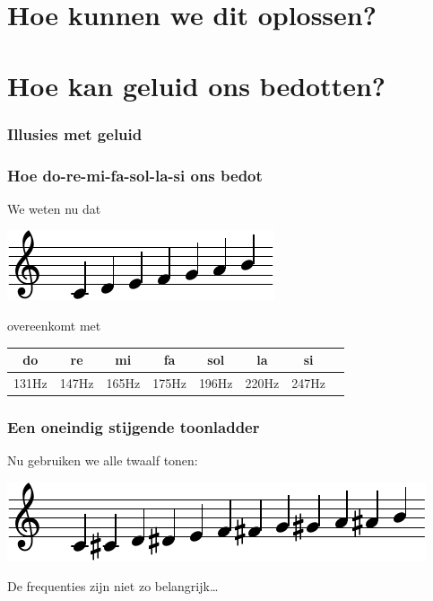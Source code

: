 \documentclass[compress, darktitle, framenumber, totalframenumber]{beamer}
\begin{document}
\section{Hoe kunnen we dit oplossen?}

\section{Hoe kan geluid ons bedotten?}
\begin{frame}
  \frametitle{Illusies met geluid}

  \centering
\end{frame}

\begin{frame}
  \frametitle{Hoe do-re-mi-fa-sol-la-si ons bedot}

  We weten nu dat
  \begin{center}
    \includegraphics{scores/scale-cropped}
  \end{center}
  overeenkomt met
  \begin{center}
    \begin{tabular}[h]{cccccccc}
      do & re & mi & fa & sol & la & si \\\midrule
      131Hz & 147Hz & 165Hz & 175Hz & 196Hz & 220Hz & 247Hz
    \end{tabular}
  \end{center}
\end{frame}

\begin{frame}
  \frametitle{Een oneindig stijgende toonladder}

  Nu gebruiken we alle twaalf tonen:
  \begin{center}
    \includegraphics{scores/scale-full-cropped}
  \end{center}
  De frequenties zijn niet zo belangrijk\ldots
\end{frame}
\end{document}

